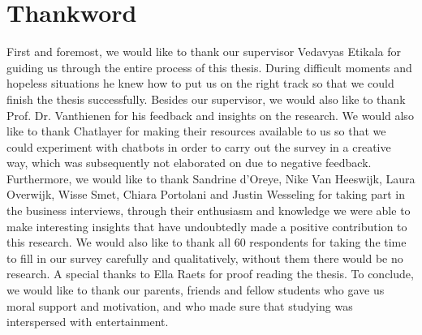 \chapter*{Thankword\hfill} 
\label{ch:thankword}
First and foremost, we would like to thank our supervisor Vedavyas Etikala for guiding us through the entire process of this thesis. During difficult moments and hopeless situations he knew how to put us on the right track so that we could finish the thesis successfully. Besides our supervisor, we would also like to thank Prof. Dr. Vanthienen for his feedback and insights on the research. We would also like to thank Chatlayer for making their resources available to us so that we could experiment with chatbots in order to carry out the survey in a creative way, which was subsequently not elaborated on due to negative feedback. Furthermore, we would like to thank Sandrine d'Oreye, Nike Van Heeswijk, Laura Overwijk, Wisse Smet, Chiara Portolani and Justin Wesseling for taking part in the business interviews, through their enthusiasm and knowledge we were able to make interesting insights that have undoubtedly made a positive contribution to this research. We would also like to thank all 60 respondents for taking the time to fill in our survey carefully and qualitatively, without them there would be no research. A special thanks to Ella Raets for proof reading the thesis. To conclude, we would like to thank our parents, friends and fellow students who gave us moral support and motivation, and who made sure that studying was interspersed with entertainment.









